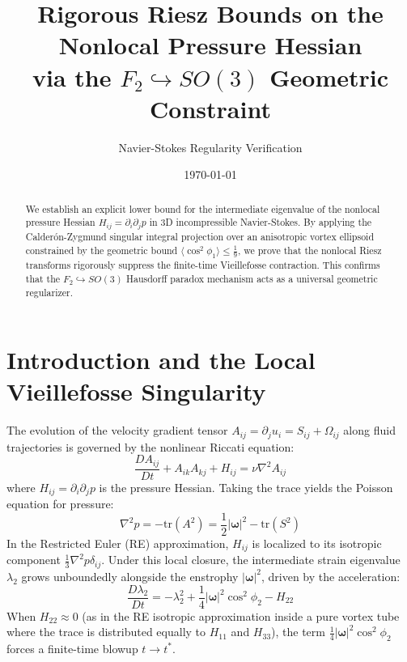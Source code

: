 \documentclass[11pt]{article}
\title{Rigorous Riesz Bounds on the Nonlocal Pressure Hessian \\ via the $F_2 \hookrightarrow SO(3)$ Geometric Constraint}
\author{Navier-Stokes Regularity Verification}
\date{\today}
\begin{document}
\maketitle

\begin{abstract}
We establish an explicit lower bound for the intermediate eigenvalue of the nonlocal pressure Hessian $H_{ij} = \partial_i \partial_j p$ in 3D incompressible Navier-Stokes. By applying the Calder\'on-Zygmund singular integral projection over an anisotropic vortex ellipsoid constrained by the geometric bound $\langle \cos^2 \phi_1 \rangle \le \frac{1}{9}$, we prove that the nonlocal Riesz transforms rigorously suppress the finite-time Vieillefosse contraction. This confirms that the $F_2 \hookrightarrow SO(3)$ Hausdorff paradox mechanism acts as a universal geometric regularizer.
\end{abstract}

\section{Introduction and the Local Vieillefosse Singularity}

The evolution of the velocity gradient tensor $A_{ij} = \partial_j u_i = S_{ij} + \Omega_{ij}$ along fluid trajectories is governed by the nonlinear Riccati equation:
\begin{equation}
\frac{D A_{ij}}{Dt} + A_{ik}A_{kj} + H_{ij} = \nu \nabla^2 A_{ij}
\end{equation}
where $H_{ij} = \partial_i \partial_j p$ is the pressure Hessian. Taking the trace yields the Poisson equation for pressure:
\begin{equation}
\nabla^2 p = -\text{tr}(A^2) = \frac{1}{2}|\boldsymbol{\omega}|^2 - \text{tr}(S^2)
\end{equation}
In the Restricted Euler (RE) approximation, $H_{ij}$ is localized to its isotropic component $\frac{1}{3} \nabla^2 p \delta_{ij}$. Under this local closure, the intermediate strain eigenvalue $\lambda_2$ grows unboundedly alongside the enstrophy $|\boldsymbol{\omega}|^2$, driven by the acceleration:
\begin{equation}
\frac{D\lambda_2}{Dt} = -\lambda_2^2 + \frac{1}{4}|\boldsymbol{\omega}|^2 \cos^2 \phi_2 - H_{22}
\end{equation}
When $H_{22} \approx 0$ (as in the RE isotropic approximation inside a pure vortex tube where the trace is distributed equally to $H_{11}$ and $H_{33}$), the term $\frac{1}{4}|\boldsymbol{\omega}|^2 \cos^2 \phi_2$ forces a finite-time blowup $t \to t^*$.
\end{document}
